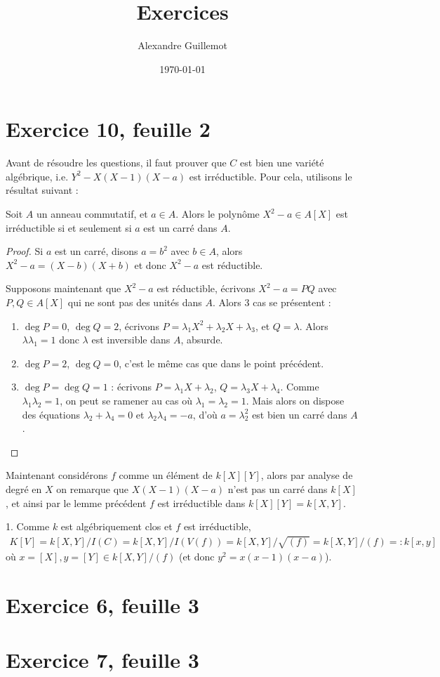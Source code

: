 \documentclass[11pt]{article}
\begin{document}
\title{Exercices}
\date{\today}
\author{Alexandre Guillemot}
\maketitle

\section*{Exercice 10, feuille 2}
Avant de résoudre les questions, il faut prouver que $C$ est bien une variété algébrique, i.e. $Y^2 - X(X-1)(X-a)$ est irréductible. Pour cela, utilisons le résultat suivant :
\begin{lemm}
    Soit $A$ un anneau commutatif, et $a \in A$. Alors le polynôme $X^2 - a \in A[X]$ est irréductible si et seulement si $a$ est un carré dans $A$.
\end{lemm}
\begin{proof}
    \item Si $a$ est un carré, disons $a = b^2$ avec $b \in A$, alors $X^2 - a = (X - b)(X + b)$ et donc $X^2 - a$ est réductible.
    \item Supposons maintenant que $X^2 - a$ est réductible, écrivons $X^2 - a = PQ$ avec $P,Q \in A[X]$ qui ne sont pas des unités dans $A$. Alors 3 cas se présentent :
    \begin{enumerate}
        \item $\deg P = 0$, $\deg Q = 2$, écrivons $P = \lambda_1X^2 + \lambda_2X + \lambda_3$, et $Q = \lambda$. Alors $\lambda \lambda_1 = 1$ donc $\lambda$ est inversible dans $A$, absurde.
        \item $\deg P = 2$, $\deg Q = 0$, c'est le même cas que dans le point précédent.
        \item $\deg P = \deg Q = 1$ : écrivons $P = \lambda_1X + \lambda_2$, $Q = \lambda_3X + \lambda_4$. Comme $\lambda_1\lambda_2 = 1$, on peut se ramener au cas où $\lambda_1 = \lambda_2 = 1$. Mais alors on dispose des équations $\lambda_2 + \lambda_4 = 0$ et $\lambda_2 \lambda_4 = -a$, d'où $a = \lambda_2^2$ est bien un carré dans $A$.
    \end{enumerate}
\end{proof}
Maintenant considérons $f$ comme un élément de $k[X][Y]$, alors par analyse de degré en $X$ on remarque que $X(X-1)(X-a)$ n'est pas un carré dans $k[X]$, et ainsi par le lemme précédent $f$ est irréductible dans $k[X][Y] = k[X,Y]$.
\begin{question}{1.}
    Comme $k$ est algébriquement clos et $f$ est irréductible,
    \begin{align*}
        K[V] = k[X,Y]/I(C) = k[X,Y]/I(V(f)) = k[X,Y]/\sqrt{(f)} = k[X,Y]/(f) =: k[x,y]
    \end{align*}
    où $x = [X], y = [Y] \in k[X,Y]/(f)$ (et donc $y^2 = x(x-1)(x-a)$).
\end{question}

\section*{Exercice 6, feuille 3}

\section*{Exercice 7, feuille 3}
\end{document}
